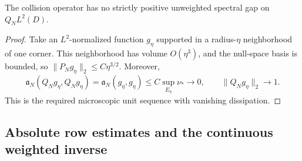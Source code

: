 \begin{corollary}\label{geom:nogap}
The collision operator has no strictly positive unweighted spectral gap
on $Q_NL^2(D)$.
\end{corollary}
\begin{proof}
Take an $L^2$-normalized function $g_\eta$ supported in a radius-$\eta$
neighborhood of one corner. This neighborhood has volume $O(\eta^3)$,
and the null-space basis is bounded, so
$\|P_Ng_\eta\|_2\le C\eta^{3/2}$. Moreover,
\[
 \mathfrak a_N(Q_Ng_\eta,Q_Ng_\eta)
 =\mathfrak a_N(g_\eta,g_\eta)
 \le C\sup_{E_\eta}\nu_*\longrightarrow0,
 \qquad\|Q_Ng_\eta\|_2\longrightarrow1.
\]
This is the required microscopic unit sequence with vanishing dissipation.
\end{proof}

\subsection{Absolute row estimates and the continuous weighted inverse}

